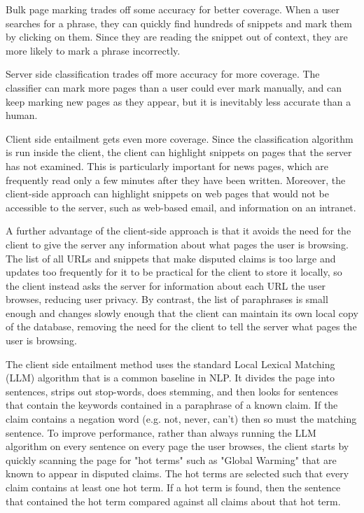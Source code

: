 \documentclass{www2010-submission}
\begin{document}
Bulk page marking trades off some accuracy for better coverage. When a user searches for a phrase, they can quickly find hundreds of snippets and mark them by clicking on them. Since they are reading the snippet out of context, they are more likely to mark a phrase incorrectly. 

Server side classification trades off more accuracy for more coverage. The classifier can mark more pages than a user could ever mark manually, and can keep marking new pages as they appear, but it is inevitably less accurate than a human.

Client side entailment gets even more coverage. Since the classification algorithm is run inside the client, the client can highlight snippets on pages that the server has not examined. This is particularly important for news pages, which are frequently read only a few minutes after they have been written. Moreover, the client-side approach can highlight snippets on web pages that would not be accessible to the server, such as web-based email, and information on an intranet. 

A further advantage of the client-side approach is that it avoids the need for the client to give the server any information about what pages the user is browsing. The list of all URLs and snippets that make disputed claims is too large and updates too frequently for it to be practical for the client to store it locally, so the client instead asks the server for information about each URL the user browses, reducing user privacy. By contrast, the list of paraphrases is small enough and changes slowly enough that the client can maintain its own local copy of the database, removing the need for the client to tell the server what pages the user is browsing.

The client side entailment method uses the standard Local Lexical Matching (LLM) algorithm that is a common baseline in NLP. It divides the page into sentences, strips out stop-words, does stemming, and then looks for sentences that contain the keywords contained in a paraphrase of a known claim. If the claim contains a negation word (e.g. not, never, can't) then so must the matching sentence. To improve performance, rather than always running the LLM algorithm on every sentence on every page the user browses, the client starts by quickly scanning the page for "hot terms" such as "Global Warming" that are known to appear in disputed claims. The hot terms are selected such that every claim contains at least one hot term. If a hot term is found, then the sentence that contained the hot term compared against all claims about that hot term.
\end{document}
